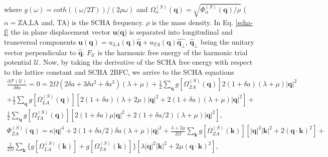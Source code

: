 where $g(\omega)=coth((\omega/2T))/(2\rho\omega)$ and $\Omega_{\alpha}^{(S)}(\boldsymbol{q})=\sqrt{\Phi_{\alpha}^{(S)}(\boldsymbol{q})/\rho}$ ($\alpha=$ZA,LA and, TA) is the SCHA frequency. $\rho$ is the mass density. In 
Eq. \ref{scha-f} the in plane displacement vector $\boldsymbol{u}(\boldsymbol{q}$) is separated into longitudinal 
and transversal components $\boldsymbol{u}(\boldsymbol{q})=u_{LA}(\boldsymbol{q})\hat{\boldsymbol{q}}+u_{TA}(\boldsymbol{q})\hat{\boldsymbol{q}_{\perp}}$, $\hat{\boldsymbol{q}}_{\perp}$ being the unitary vector perpendicular to 
$\hat{\boldsymbol{q}}$. $F_{\mathcal{U}}$ is the harmonic free energy of the harmonic trial potential $\mathcal{U}$. 
Now, by taking the derivative of the SCHA free energy with respect to the lattice constant and SCHA 2BFC, we arrive 
to the SCHA equations
\begin{multline}
 \frac{\partial\mathcal{F}(\mathcal{U})}{\partial\delta a}=0=2\Omega(2\delta a+3\delta a^{2}+\delta a^{3})(\lambda+
\mu)+\frac{1}{2}\sum_{\boldsymbol{q}}g[\Omega_{ZA}^{(S)}(\boldsymbol{q})]2(1+\delta a)(\lambda+\mu)|\boldsymbol{
 q}|^{2}\\+\frac{1}{2}\sum_{\boldsymbol{q}}g[\Omega_{LA}^{(S)}(\boldsymbol{q})][2(1+\delta a)(\lambda+2\mu)|\boldsymbol{q}|^{2}+2(1+\delta a)(\lambda+\mu)|\boldsymbol{q}|^{2}]+\\\frac{1}{2}\sum_{\boldsymbol{q}}g[\Omega_{
 TA}^{(S)}(\boldsymbol{q})][2(1+\delta a)\mu|\boldsymbol{q}|^{2}+2(1+\delta a/2)(\lambda+\mu)|\boldsymbol{q}|^{2}],
\end{multline}
\begin{multline}
 \Phi_{ZA}^{(S)}(\boldsymbol{q})=\kappa|\boldsymbol{q}|^{4}+2(1+\delta a/2)\delta a(\lambda+\mu)|\boldsymbol{q}|^{2}+\frac{\lambda+2\mu}{2\Omega}\sum_{\boldsymbol{k}}g[\Omega_{ZA}^{(S)}(\boldsymbol{k})][|\boldsymbol{q}|^{2}|\boldsymbol{
 k}|^{2}+2(\boldsymbol{q}\cdot\boldsymbol{k})^{2}]+\\\frac{1}{2\Omega}\sum_{\boldsymbol{k}}\{g[\Omega_{LA}^{(S)}(\boldsymbol{k})]+g[\Omega_{TA}^{(S)}(\boldsymbol{k})]\}[\lambda|\boldsymbol{q}|^{2}|\boldsymbol{k}|^{2}+2\mu(
 \boldsymbol{q}\cdot\boldsymbol{k})^{2}],
\end{multline}
